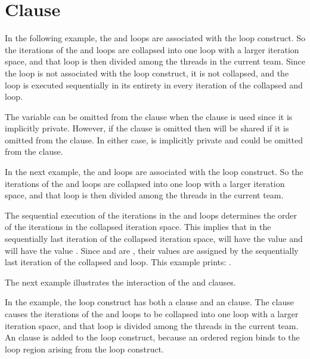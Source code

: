 \pagebreak
\section{ Clause}
\label{sec:collapse}

In the following example, the  and  loops are associated with 
the loop construct. So the iterations of the  and  loops are 
collapsed into one loop with a larger iteration space, and that loop is then divided 
among the threads in the current team. Since the  loop is not associated 
with the loop construct, it is not collapsed, and the  loop is executed 
sequentially in its entirety in every iteration of the collapsed  and 
 loop. 

The variable  can be omitted from the   clause when the 
 clause is used since it is implicitly private. However, if the 
 clause is omitted then  will be shared if it is omitted 
from the  clause. In either case,  is implicitly private 
and could be omitted from the   clause.



In the next example, the  and  loops are associated with the 
loop construct. So the iterations of the  and  loops are collapsed 
into one loop with a larger iteration space, and that loop is then divided among 
the threads in the current team.

The sequential execution of the iterations in the  and  loops 
determines the order of the iterations in the collapsed iteration space. This implies 
that in the sequentially last iteration of the collapsed iteration space,  
will have the value  and  will have the value . Since 
 and  are , their values are assigned 
by the sequentially last iteration of the collapsed  and  loop. 
This example prints: .



The next example illustrates the interaction of the  and  
 clauses.

In the example, the loop construct has both a  clause and an  
clause. The  clause causes the iterations of the  and 
 loops to be collapsed into one loop with a larger iteration space, and 
that loop is divided among the threads in the current team. An  
clause is added to the loop construct, because an ordered region binds to the loop 
region arising from the loop construct.

